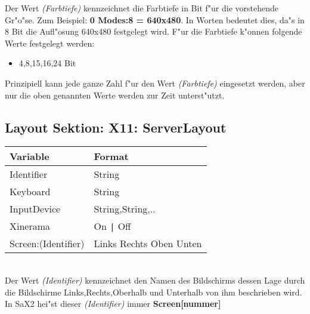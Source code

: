 Der Wert \textit{(Farbtiefe)} kennzeichnet die Farbtiefe in Bit f"ur die
vorstehende Gr"o"se. Zum Beispiel: \textbf{0 Modes:8 = 640x480}. In 
Worten bedeutet dies, da"s in 8 Bit die Aufl"osung 640x480 festgelegt
wird. F"ur die Farbtiefe k"onnen folgende Werte festgelegt werden:
\begin{itemize}
\item 4,8,15,16,24 Bit
\end{itemize}
Prinzipiell kann jede ganze Zahl f"ur den Wert \textit{(Farbtiefe)}
eingesetzt werden, aber nur die oben genannten Werte werden zur Zeit
unterst"utzt.

\subsection{Layout Sektion: X11: ServerLayout}
\begin{tabular}[h]{|p{5cm}|p{7cm}|}
 \hline
 \textbf{Variable}     & \textbf{Format}        \\
 \hline
 Identifier                 & String                   \\
 Keyboard                   & String                   \\
 InputDevice                & String,String,..         \\
 Xinerama                   & On \verb+|+ Off          \\
 Screen:(Identifier)        & Links Rechts Oben Unten  \\
 \hline
\end{tabular}\\

Der Wert \textit{(Identifier)} kennzeichnet den Namen des 
Bildschirms dessen Lage durch die Bildschirme Links,Rechts,Oberhalb
und Unterhalb von ihm beschrieben wird. In SaX2 hei"st dieser
\textit{(Identifier)} immer \textbf{Screen[nummer]}

